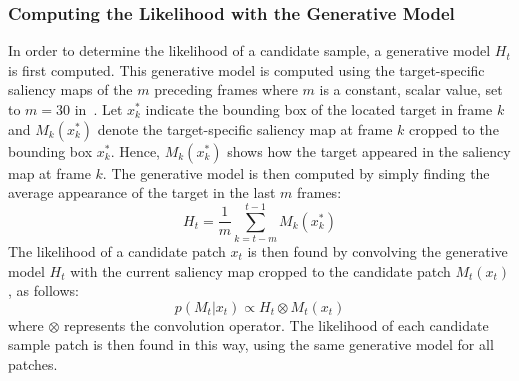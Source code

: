 \documentclass{sig-alternate-05-2015}
\begin{document}
\subsubsection{Computing the Likelihood with the Generative Model}
In order to determine the likelihood of a candidate sample, a generative model $H_t$ is first computed.
This generative model is computed using the target-specific saliency maps of the $m$ preceding frames where $m$ is a constant, scalar value, set to $m = 30$ in~\cite{hong2015online}.
Let $x_k^*$ indicate the bounding box of the located target in frame $k$ and $M_k(x^*_k)$ denote the target-specific saliency map at frame $k$ cropped to the bounding box $x^*_k$.
Hence, $M_k(x^*_k)$ shows how the target appeared in the saliency map at frame $k$.
The generative model is then computed by simply finding the average appearance of the target in the last $m$ frames:
\begin{equation}
H_t = \frac{1}{m} \sum_{k=t-m}^{t-1} M_k(x^*_k)
\end{equation}
The likelihood of a candidate patch $x_t$ is then found by convolving the generative model $H_t$ with the current saliency map cropped to the candidate patch $M_t(x_t)$, as follows:
\begin{equation}
p(M_t|x_t) \propto H_t \otimes M_t(x_t)
\end{equation}
where $\otimes$ represents the convolution operator.
The likelihood of each candidate sample patch is then found in this way, using the same generative model for all patches.
\end{document}
